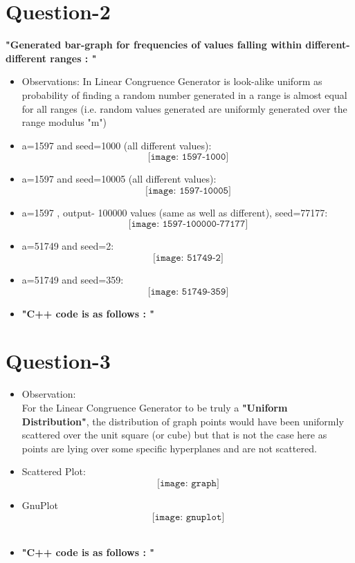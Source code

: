 \documentclass{article}
\begin{document}
\section{Question-2}
\textbf{"Generated bar-graph for frequencies of values falling within different-different ranges : "}
\begin{itemize}
\item Observations:
In Linear Congruence Generator is look-alike uniform as probability of finding a random number generated in a range is almost equal for all ranges (i.e. random values generated are uniformly generated over the range modulus "m")
\item a=1597 and seed=1000 (all different values):
\[\texttt{[image: 1597-1000]}\]
\item a=1597 and seed=10005 (all different values):
\[\texttt{[image: 1597-10005]}\]
\item a=1597 , output- 100000 values (same as well as different), seed=77177:
\[\texttt{[image: 1597-100000-77177]}\]
\item a=51749 and seed=2:
\[\texttt{[image: 51749-2]}\]
\item a=51749 and seed=359:
\[\texttt{[image: 51749-359]}\]
\item \textbf{"C++ code is as follows : "}
\end{itemize}
\vspace{20mm}
\section{Question-3}
\begin{itemize}
\item Observation:\\
For the Linear Congruence Generator to be truly a \textbf{"Uniform Distribution"}, the distribution of graph points would have been uniformly scattered over the unit square (or cube) but that is not the case here as points are lying over some specific hyperplanes and are not scattered. 
\item Scattered Plot:
\[\texttt{[image: graph]}\]
\item GnuPlot
\[\texttt{[image: gnuplot]}\]
\\
\item \textbf{"C++ code is as follows : "}
\end{itemize}
 
\end{document}
